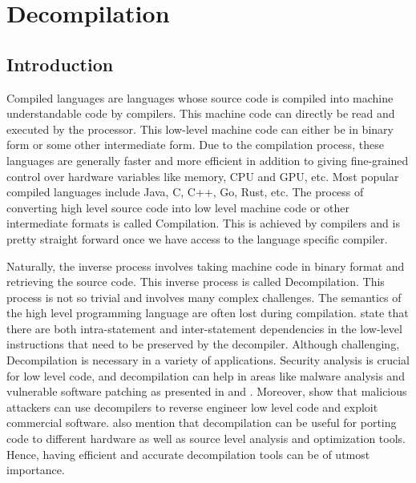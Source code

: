 \documentclass{article}
\begin{document}
\section{Decompilation}
\label{decompilation}

\subsection{Introduction}
Compiled languages are languages whose source code is compiled into machine understandable code by compilers. This machine code can directly be read and executed by the processor. This low-level machine code can either be in binary form or some other intermediate form. Due to the compilation process, these languages are generally faster and more efficient in addition to giving fine-grained control over hardware variables like memory, CPU and GPU, etc. Most popular compiled languages include Java, C, C++, Go, Rust, etc. The process of converting high level source code into low level machine code or other intermediate formats is called Compilation. This is achieved by compilers and is pretty straight forward once we have access to the language specific compiler.

Naturally, the inverse process involves taking machine code in binary format and retrieving the source code. This inverse process is called Decompilation. This process is not so trivial and involves many complex challenges. The semantics of the high level programming language are often lost during compilation. \citet{coda} state that there are both intra-statement and inter-statement dependencies in the low-level instructions that need to be preserved by the decompiler. Although challenging, Decompilation is necessary in a variety of applications. Security analysis is crucial for low level code, and decompilation can help in areas like malware analysis and vulnerable software patching as presented in \citet{kolbitsch2009effective} and \citet{yakdan2016helping}. Moreover, \citet{lee2011tie} show that malicious attackers can use decompilers to reverse engineer low level code and exploit commercial software. \citet{katz2019towards} also mention that decompilation can be useful for porting code to different hardware as well as source level analysis and optimization tools. Hence, having efficient and accurate decompilation tools can be of utmost importance.
\end{document}
